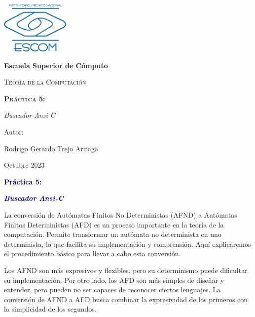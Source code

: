 \documentclass[11pt]{article} %
\begin{document}
	
	\begin{titlepage}
		\centering
		{\includegraphics[width=0.25\textwidth]{descarga}\par}
		\vspace{0.5cm}
		{\bfseries\huge Escuela Superior de Cómputo \par}
		\vspace{0.7cm}
		{\scshape\LARGE Teoría de la Computación \par}
		\vspace{0.3cm}
		\vspace{3.1cm}
		{\scshape \Huge \textbf{Práctica 5:}  \par}
		\vspace{0.03cm}
		{{\LARGE \textit{Buscador Ansi-C}} \par}
		\vspace{3.5cm}
		{\Large Autor: \par}
		{\Large Rodrigo Gerardo Trejo Arriaga \par}
		\vspace{3cm}
		{\Large Octubre 2023 \par}
	\end{titlepage}
	
	\begin{center}
		\vspace*{0.1cm}
		{\huge \textcolor{darkBlue}{\textbf{Práctica 5:}} \par}
		
		{\Large \textcolor{darkBlue}{\textbf{\textit{Buscador Ansi-C}}}}
	\end{center}
	
	
	
	La conversión de Autómatas Finitos No Deterministas (AFND) a Autómatas Finitos Deterministas (AFD) es un proceso importante en la teoría de la computación. Permite transformar un autómata no determinista en uno determinista, lo que facilita su implementación y comprensión. Aquí explicaremos el procedimiento básico para llevar a cabo esta conversión.
	
	
	Los AFND son más expresivos y flexibles, pero su determinismo puede dificultar su implementación. Por otro lado, los AFD son más simples de diseñar y entender, pero pueden no ser capaces de reconocer ciertos lenguajes. La conversión de AFND a AFD busca combinar la expresividad de los primeros con la simplicidad de los segundos.
	
\end{document}
